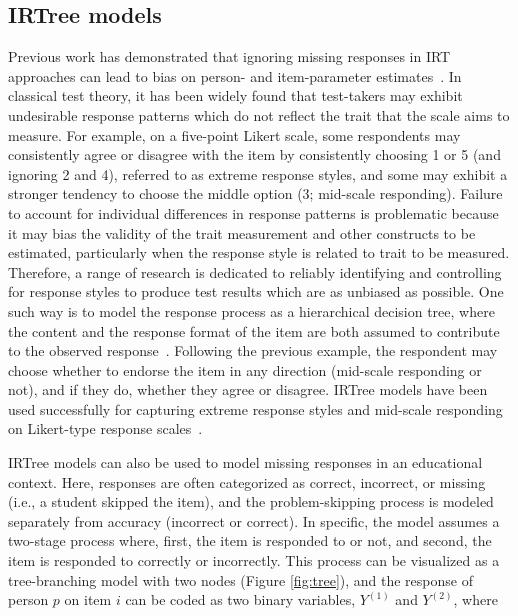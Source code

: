 \documentclass[manuscript]{acmart}
\begin{document}
\subsection{IRTree models}
Previous work has demonstrated that ignoring missing responses in IRT approaches can lead to bias on person- and item-parameter estimates~\cite{finch2008estimation, mislevy1996missing, pohl2014dealing, holman2005modelling, debeer2017modeling}. In classical test theory, it has been widely found that test-takers may exhibit undesirable response patterns which do not reflect the trait that the scale aims to measure. For example, on a five-point Likert scale, some respondents may consistently agree or disagree with the item by consistently choosing 1 or 5 (and ignoring 2 and 4), referred to as extreme response styles, and some may exhibit a stronger tendency to choose the middle option (3; mid-scale responding). Failure to account for individual differences in response patterns is problematic because it may bias the validity of the trait measurement and other constructs to be estimated,  particularly when the response style is related to trait to be measured. Therefore, a range of research is dedicated to reliably identifying and controlling for response styles to produce test results which are as unbiased as possible. One such way is to model the response process as a hierarchical decision tree, where the content and the response format of the item are both assumed to contribute to the observed response~\cite{bockenholt2012modeling, de2012irtrees, thissen2013two}. Following the previous example, the respondent may choose whether to endorse the item in any direction (mid-scale responding or not), and if they do, whether they agree or disagree. IRTree models have been used successfully for capturing extreme response styles and mid-scale responding on Likert-type response scales~\cite{bockenholt2017response, thissen2013two}. 

IRTree models can also be used to model missing responses in an educational context. Here, responses are often categorized as correct, incorrect, or missing (i.e., a student skipped the item), and the problem-skipping process is modeled separately from accuracy (incorrect or correct). In specific, the model assumes a two-stage process where, first, the item is responded to or not, and second, the item is responded to correctly or incorrectly. This process can be visualized as a tree-branching model with two nodes (Figure \ref{fig:tree}), and the response of person $p$ on item $i$ can be coded as two binary variables, $Y^{(1)}$ and $Y^{(2)}$, where 
\end{document}
